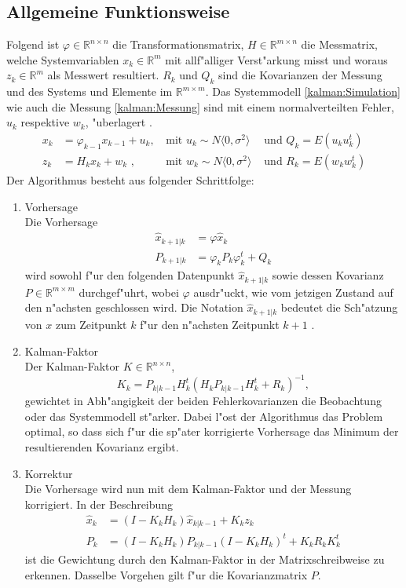 \begin{refsection}
\subsection{Allgemeine Funktionsweise}
Folgend ist $\varphi \in \mathbb{R}^{n\times n}$ die Transformationsmatrix,
$H \in \mathbb{R}^{m\times n}$ die Messmatrix, welche Systemvariablen
$x_{k}\in \mathbb{R}^{m}$ mit allf"alliger Verst"arkung misst und
woraus $z_{k}\in \mathbb{R}^{m}$ als Messwert resultiert. $R_{k}$
und $Q_{k}$ sind die Kovarianzen der Messung und des Systems und
Elemente im $\mathbb{R}^{m\times m}$. Das Systemmodell
\eqref{kalman:Simulation} wie auch die Messung \eqref{kalman:Messung}
sind mit einem normalverteilten Fehler, $u_{k}$ respektive $w_{k}$,
"uberlagert \cite{skript:WRStat}.
\begin{align}
x_{k}&=\varphi_{k-1}x_{k-1}+u_{k} \text{, } &\text{mit } u_{k}\sim N\langle0,\sigma^{2}\rangle &\text{ und } Q_{k}=E(u_{k}u^{t}_{k}) \label{kalman:Simulation}\\
z_{k}&=H_{k}x_{k}+w_{k} \text{ ,} &\text{mit } w_{k}\sim N\langle0,\sigma^{2}\rangle &\text{ und } R_{k}=E(w_{k}w^{t}_{k})
\label{kalman:Messung}
\end{align}
Der Algorithmus besteht aus folgender Schrittfolge:
\begin{enumerate}
\item Vorhersage\\
Die Vorhersage
\begin{align*}
\hat{x}_{k+1|k} &= \varphi\hat{x}_{k}\\
P_{k+1|k} &=\varphi_{k}P_{k}\varphi_{k}^{t}+Q_{k}
\end{align*}
wird sowohl f"ur den folgenden Datenpunkt $\hat{x}_{k+1|k}$
sowie dessen Kovarianz $P \in \mathbb{R}^{m\times m}$ durchgef"uhrt,
wobei $\varphi$ ausdr"uckt, wie vom jetzigen Zustand auf den n"achsten
geschlossen wird. Die Notation $\hat{x}_{k+1|k}$ bedeutet die
Sch"atzung von $x$ zum Zeitpunkt $k$ f"ur den n"achsten Zeitpunkt
$k+1$ .
\item Kalman-Faktor\\
Der Kalman-Faktor $K \in \mathbb{R}^{n\times n}$,
\[
K_{k}=P_{k|k-1}H^{t}_{k}(H_{k}P_{k|k-1}H^{t}_{k}+R_{k})^{-1},
\]
gewichtet in
Abh"angigkeit der beiden Fehlerkovarianzen die Beobachtung oder das
Systemmodell st"arker. Dabei l"ost der Algorithmus das Problem
optimal, so dass sich f"ur die sp"ater korrigierte Vorhersage das
Minimum der resultierenden Kovarianz ergibt.\\
\item Korrektur\\
Die Vorhersage wird nun mit dem Kalman-Faktor und der Messung
korrigiert. In der Beschreibung
\begin{align*}
\hat{x}_{k}&=(I-K_{k}H_{k})\hat{x}_{k|k-1}+K_{k}z_{k} \\
P_{k} &=(I-K_{k}H_{k})P_{k|k-1}(I-K_{k}H_{k})^{t}+K_{k}R_{k}K^{t}_{k}
\end{align*}
ist die Gewichtung durch
den Kalman-Faktor in der Matrixschreibweise zu erkennen. Dasselbe
Vorgehen gilt f"ur die Kovarianzmatrix $P$.
\end{enumerate}


\end{refsection}
